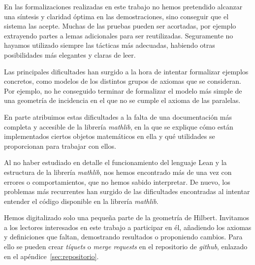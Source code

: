 En las formalizaciones realizadas en este trabajo no hemos pretendido alcanzar
una síntesis y claridad óptima en las demostraciones, sino conseguir que el
sistema las acepte. Muchas de las pruebas pueden ser acortadas, por ejemplo
extrayendo partes a lemas adicionales para ser reutilizadas. Seguramente no
hayamos utilizado siempre las tácticas más adecuadas, habiendo otras
posibilidades más elegantes y claras de leer.

Las principales dificultades han surgido a la hora de intentar formalizar
ejemplos concretos, como modelos de los distintos grupos de axiomas que se
consideran. Por ejemplo, no he conseguido terminar de formalizar el modelo más
simple de una geometría de incidencia en el que no se cumple el axioma de las
paralelas.

En parte atribuimos estas dificultades a la falta de una documentación más
completa y accesible de la librería \textit{mathlib}, en la que se explique cómo
están implementados ciertos objetos matemáticos en ella y qué utilidades se
proporcionan para trabajar con ellos.

Al no haber estudiado en detalle el funcionamiento del lenguaje Lean y
la estructura de la librería \textit{mathlib}, nos hemos encontrado más de una vez con
errores o comportamientos, que no hemos sabido interpretar. De nuevo, los
problemas más recurrentes han surgido de las dificultades encontradas al
intentar entender el código disponible en la librería \textit{mathlib}.

Hemos digitalizado solo una pequeña parte de la geometría de Hilbert. Invitamos
a los lectores interesados en este trabajo a participar en él, añadiendo los
axiomas y definiciones que faltan, demostrando resultados o proponiendo cambios.
Para ello se pueden crear \textit{tíquets} o \textit{merge requests} en el
repositorio de \textit{github}, enlazado en el apéndice~\ref{sec:repositorio}.

